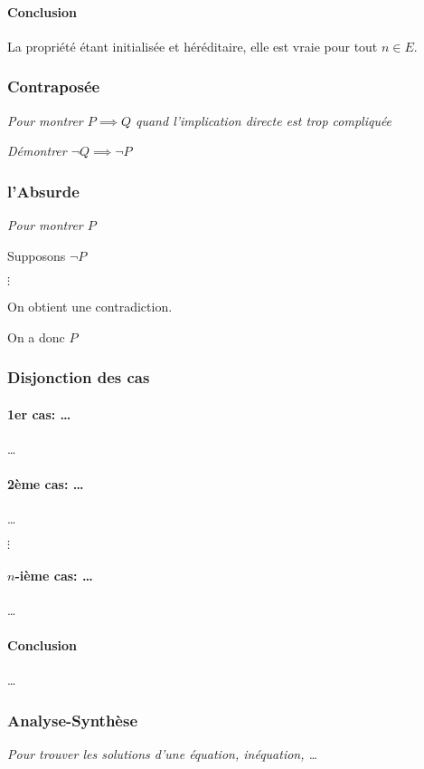 \documentclass{article}
\begin{document}
\paragraph{Conclusion}
La propriété étant initialisée et héréditaire, elle est vraie pour tout $n \in E$.

\subsubsection{Contraposée}
\emph{Pour montrer $P \implies Q$ quand l'implication directe est trop compliquée}

\emph{Démontrer $\lnot Q \implies \lnot P$} 

\subsubsection{l'Absurde}

\emph{Pour montrer $P$} 

Supposons $\lnot P$

$\vdots$

On obtient une contradiction.

On a donc $P$

\subsubsection{Disjonction des cas}

\paragraph{1er cas: \ldots} \ldots

\paragraph{2ème cas: \ldots} \ldots

$\vdots$

\paragraph{$n$-ième cas: \ldots} \ldots

\paragraph{Conclusion}
\ldots

\subsubsection{Analyse-Synthèse}
\emph{Pour trouver les solutions d'une équation, inéquation, \ldots}
\end{document}
